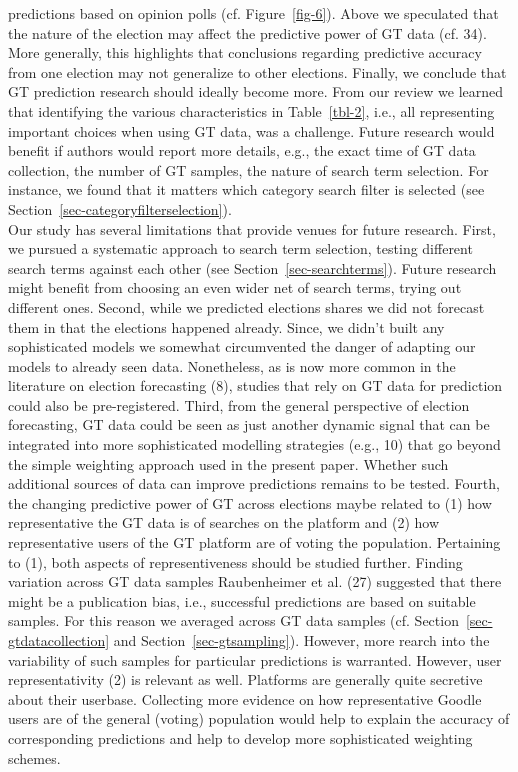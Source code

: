 \documentclass[
  letterpaper,
  DIV=11,
  numbers=noendperiod]{scrartcl}
\begin{document}
predictions based on opinion polls (cf. Figure~\ref{fig-6}). Above we
speculated that the nature of the election may affect the predictive
power of GT data (cf. 34). More generally, this highlights that
conclusions regarding predictive accuracy from one election may not
generalize to other elections. Finally, we conclude that GT prediction
research should ideally become more. From our review we learned that
identifying the various characteristics in Table~\ref{tbl-2}, i.e., all
representing important choices when using GT data, was a challenge.
Future research would benefit if authors would report more details,
e.g., the exact time of GT data collection, the number of GT samples,
the nature of search term selection. For instance, we found that it
matters which category search filter is selected (see
Section~\ref{sec-categoryfilterselection}).\\
Our study has several limitations that provide venues for future
research. First, we pursued a systematic approach to search term
selection, testing different search terms against each other (see
Section~\ref{sec-searchterms}). Future research might benefit from
choosing an even wider net of search terms, trying out different ones.
Second, while we predicted elections shares we did not forecast them in
that the elections happened already. Since, we didn't built any
sophisticated models we somewhat circumvented the danger of adapting our
models to already seen data. Nonetheless, as is now more common in the
literature on election forecasting (8), studies that rely on GT data for
prediction could also be pre-registered. Third, from the general
perspective of election forecasting, GT data could be seen as just
another dynamic signal that can be integrated into more sophisticated
modelling strategies (e.g., 10) that go beyond the simple weighting
approach used in the present paper. Whether such additional sources of
data can improve predictions remains to be tested. Fourth, the changing
predictive power of GT across elections maybe related to (1) how
representative the GT data is of searches on the platform and (2) how
representative users of the GT platform are of voting the population.
Pertaining to (1), both aspects of representiveness should be studied
further. Finding variation across GT data samples Raubenheimer et al.
(27) suggested that there might be a publication bias, i.e., successful
predictions are based on suitable samples. For this reason we averaged
across GT data samples (cf. Section~\ref{sec-gtdatacollection} and
Section~\ref{sec-gtsampling}). However, more rearch into the variability
of such samples for particular predictions is warranted. However, user
representativity (2) is relevant as well. Platforms are generally quite
secretive about their userbase. Collecting more evidence on how
representative Goodle users are of the general (voting) population would
help to explain the accuracy of corresponding predictions and help to
develop more sophisticated weighting schemes.
\end{document}
